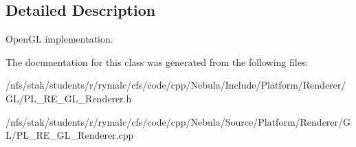 \subsection{Detailed Description}
OpenGL implementation. 

The documentation for this class was generated from the following files:\begin{DoxyCompactItemize}
\item 
/nfs/stak/students/r/rymalc/cfs/code/cpp/Nebula/Include/Platform/Renderer/GL/PL\_\-RE\_\-GL\_\-Renderer.h\item 
/nfs/stak/students/r/rymalc/cfs/code/cpp/Nebula/Source/Platform/Renderer/GL/PL\_\-RE\_\-GL\_\-Renderer.cpp\end{DoxyCompactItemize}
